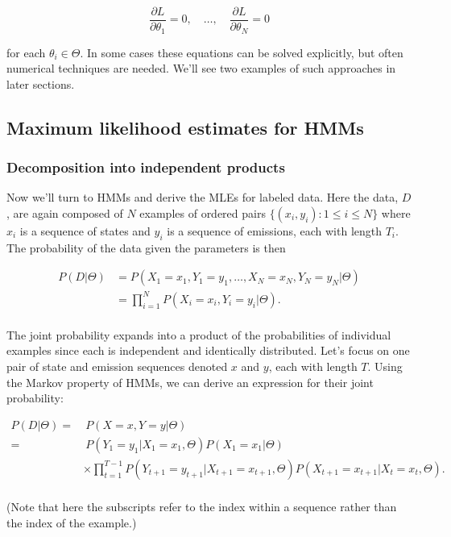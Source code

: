 \begin{equation*}
\frac{\partial L}{\partial \theta_1} = 0, \quad \ldots, \quad \frac{\partial L}{\partial \theta_N} = 0
\end{equation*}

for each $\theta_i \in \Theta$. In some cases these equations can be solved explicitly, but often numerical techniques are needed. We'll see two examples of such approaches in later sections.

\subsection{Maximum likelihood estimates for HMMs}

\subsubsection{Decomposition into independent products}

Now we'll turn to HMMs and derive the MLEs for labeled data. Here the data, $D$, are again composed of $N$ examples of ordered pairs $\{(x_i, y_i): 1 \le i \le N\}$ where $x_i$ is a sequence of states and $y_i$ is a sequence of emissions, each with length $T_i$. The probability of the data given the parameters is then

\begin{align*}
P(D|\Theta)
&= P(X_1=x_1, Y_1=y_1, \ldots, X_N=x_N, Y_N=y_N|\Theta) \\
&= \prod_{i=1}^N P(X_i=x_i, Y_i=y_i|\Theta). \\
\end{align*}

The joint probability expands into a product of the probabilities of individual examples since each is independent and identically distributed. Let's focus on one pair of state and emission sequences denoted $x$ and $y$, each with length $T$. Using the Markov property of HMMs, we can derive an expression for their joint probability:

\begin{align*}
P(D|\Theta)
=& \ P(X=x, Y=y|\Theta) \\
=& \ P(Y_1=y_1|X_1=x_1,\Theta) P(X_1=x_1|\Theta) \\
 & \times \prod_{t=1}^{T-1} P(Y_{t+1}=y_{t+1}|X_{t+1}=x_{t+1},\Theta) P(X_{t+1}=x_{t+1}|X_t=x_t,\Theta). \\
\end{align*}

(Note that here the subscripts refer to the index within a sequence rather than the index of the example.)

